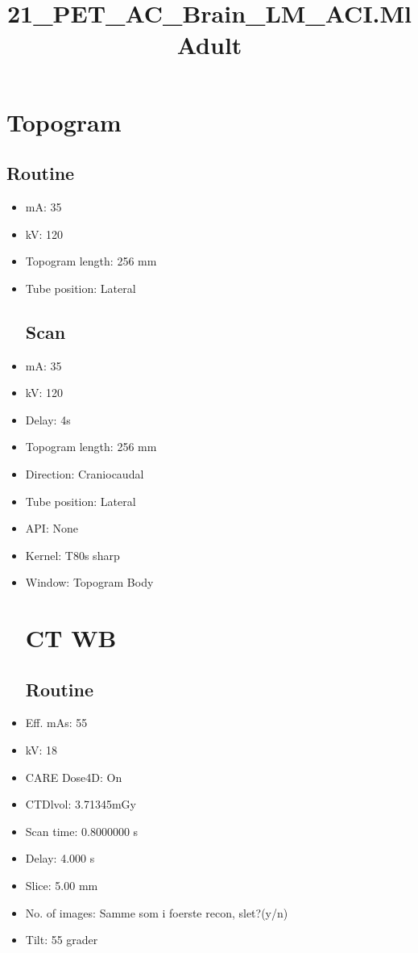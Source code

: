 \documentclass[12pt]{article}
\title{21\_PET\_AC\_Brain\_LM\_ACI.MlAdult}
\begin{document}
\maketitle
\newpage
\tableofcontents
\newpage
{}


\section{Topogram}
\subsection{Routine}
 \begin{itemize}\item mA: 35\item kV: 120\item Topogram length: 256 mm\item Tube position: Lateral
\subsection{Scan}
\item mA: 35\item kV: 120\item Delay: 4s\item Topogram length: 256 mm\item Direction: Craniocaudal\item Tube position: Lateral\item API: None\item Kernel: T80s sharp\item Window: Topogram Body
\section{CT WB}
\subsection{Routine}
\item Eff. mAs: 55\item kV: 18\item CARE Dose4D: On\item CTDlvol: 3.71345mGy\item Scan time: 0.8000000 s\item Delay: 4.000 s\item Slice: 5.00 mm\item No. of images: Samme som i foerste recon, slet?(y/n)\item Tilt: 55 grader

\end{itemize}
\end{document}
